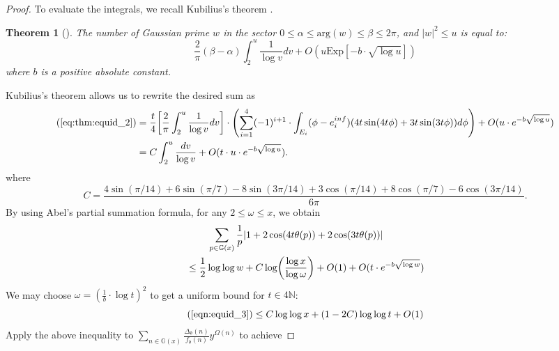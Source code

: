 \documentclass[12pt]{amsart}
\newcounter{counter}[section] %
\numberwithin{equation}{section} %
\newtheorem{theorem}[counter]{Theorem}
\theoremstyle{definition} \newtheorem{definition}[counter]{Definition}
\theoremstyle{remark} \newtheorem{nonexam}[counter]{Non-example}
\let\originalleft\left \let\originalright\right
\renewcommand{\left}{\mathopen{}\mathclose\bgroup\originalleft}
\renewcommand{\right}{\aftergroup\egroup\originalright}
\begin{document}
\begin{proof}
    To evaluate the integrals, we recall Kubilius's theorem \cite{Ku50}.
    \begin{theorem}[\cite{Ku50}]
        The number of Gaussian prime $w$ in the sector $0 \leq \alpha \leq \text{arg}(w) \leq \beta \leq 2 \pi$, and $|w|^2 \leq u$ is equal to:
        \begin{equation}
            \frac{2}{\pi}(\beta - \alpha) \int_2^u \frac{1}{\log v} dv + O(u \text{Exp}[-b \cdot \sqrt{\log u}])
        \end{equation}
        where $b$ is a positive absolute constant.
    \end{theorem}
    Kubilius's theorem allows us to rewrite the desired sum as
    \begin{align}
    \begin{split}
        (\ref{eq:thm:equid_2}) &= \frac{t}{4} \left[ \frac{2}{\pi} \int_2^u \frac{1}{\log v} dv \right] \cdot \left( \sum_{i=1}^4 (-1)^{i+1} \cdot \int_{E_i} (\phi - e_i^{inf})(4t \sin(4t \phi) + 3t \sin(3t \phi)) d \phi \right) + O(u \cdot e^{-b \sqrt{\log u}}) \\
        &= C \int_2^u \frac{dv}{\log v} + O(t \cdot u \cdot e^{-b \sqrt{\log u}}).
    \end{split}
    \end{align}
    where
    \begin{equation*}
        C = \frac{4 \sin(\pi/14) + 6\sin(\pi/7) - 8\sin(3\pi/14) + 3 \cos(\pi/14) + 8 \cos(\pi/7) - 6 \cos(3\pi/14)}{6\pi}.
    \end{equation*}
    By using Abel's partial summation formula, for any $2 \leq \omega \leq x$, we obtain
    \begin{align} \label{eqn:equid_3}
        \begin{split}
            & \; \; \; \; \; \; \; \; \sum_{p \in \mathbb{G}(x)} \frac{1}{p} |1 + 2 \cos(4t\theta(p)) + 2 \cos(3t \theta(p))| \\
            &\leq \frac{1}{2} \log \log w + C \log \left( \frac{\log x}{\log \omega} \right) + O(1) + O(t \cdot e^{-b \sqrt{\log w}})
        \end{split}
    \end{align}
    We may choose $\omega = (\frac{1}{b} \cdot \log t)^2$ to get a uniform bound for $t \in 4 \mathbb{N}$:
    \begin{equation}
        (\ref{eqn:equid_3}) \leq C \log \log x + (1-2C) \log \log t + O(1)
    \end{equation}
    Apply the above inequality to $\sum_{n \in \mathbb{G}(x)} \frac{\Delta_\mathfrak{d}(n)}{f_\mathfrak{d}(n)}y^{\Omega(n)}$ to achieve

\end{proof}
\end{document}
